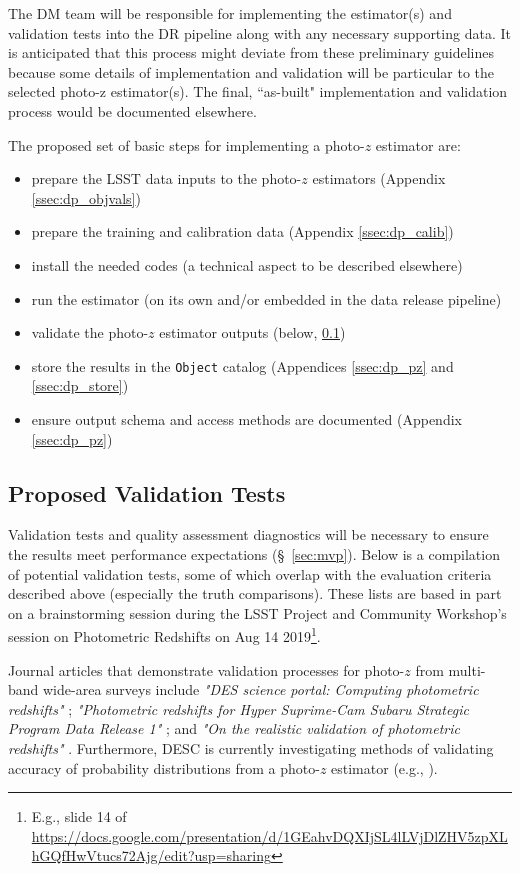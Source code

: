 \documentclass[DM,lsstdraft,toc]{lsstdoc}
\begin{document}
The DM team will be responsible for implementing the estimator(s) and validation tests into the DR pipeline along with any necessary supporting data.
It is anticipated that this process might deviate from these preliminary guidelines because some details of implementation and validation will be particular to the selected photo-z estimator(s).
The final, ``as-built" implementation and validation process would be documented elsewhere.

The proposed set of basic steps for implementing a photo-$z$ estimator are:
\vspace{-15pt}
\begin{itemize}
\item prepare the LSST data inputs to the photo-$z$ estimators (Appendix \ref{ssec:dp_objvals})
\item prepare the training and calibration data (Appendix \ref{ssec:dp_calib})
\item install the needed codes (a technical aspect to be described elsewhere)
\item run the estimator (on its own and/or embedded in the data release pipeline)
\item validate the photo-$z$ estimator outputs (below, \ref{ssec:imp_val})
\item store the results in the {\tt Object} catalog (Appendices \ref{ssec:dp_pz} and \ref{ssec:dp_store})
\item ensure output schema and access methods are documented (Appendix \ref{ssec:dp_pz})
\end{itemize}

\subsection{Proposed Validation Tests}\label{ssec:imp_val}

Validation tests and quality assessment diagnostics will be necessary to ensure the results meet performance expectations (\S~\ref{sec:mvp}).
Below is a compilation of potential validation tests, some of which overlap with the evaluation criteria described above (especially the truth comparisons). 
These lists are based in part on a brainstorming session during the LSST Project and Community Workshop's session on Photometric Redshifts on Aug 14 2019\footnote{E.g., slide 14 of \url{https://docs.google.com/presentation/d/1GEahvDQXIjSL4lLVjDlZHV5zpXLhGQfHwVtucs72Ajg/edit?usp=sharing}}.

Journal articles that demonstrate validation processes for photo-$z$ from multi-band wide-area surveys include {\it "DES science portal: Computing photometric redshifts"} \citep{2018A&C....25...58G}; {\it "Photometric redshifts for Hyper Suprime-Cam Subaru Strategic Program Data Release 1"} \citep{2018PASJ...70S...9T}; and {\it "On the realistic validation of photometric redshifts"} \citep{2017MNRAS.468.4323B}. Furthermore, DESC is currently investigating methods of validating accuracy of probability distributions from a photo-$z$ estimator (e.g., \citealt{2020arXiv200103621S}).
\end{document}
